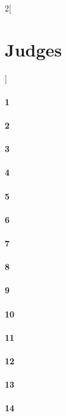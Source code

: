 \documentclass{book}
\begin{document}
\begin{multicols}{2}[\part{Judges}]
\subsection*{1}
\subsection*{2}
\subsection*{3}
\subsection*{4}
\subsection*{5}
\subsection*{6}
\subsection*{7}
\subsection*{8}
\subsection*{9}
\subsection*{10}
\subsection*{11}
\subsection*{12}
\subsection*{13}
\subsection*{14}

\end{multicols}
\end{document}
